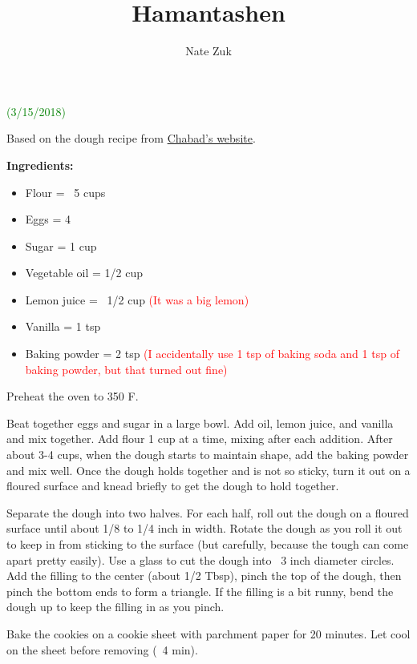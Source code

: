 \documentclass[11pt]{article}
\title{Hamantashen}
\author{Nate Zuk}
\begin{document}
\maketitle

\textcolor{green}{(3/15/2018)}

Based on the dough recipe from \href{https://www.chabad.org/library/article_cdo/aid/1366/jewish/Traditional-Hamantaschen.htm}{Chabad's website}.

\textbf{Ingredients:}

\begin{itemize}
\item Flour = ~5 cups
\item Eggs = 4
\item Sugar = 1 cup
\item Vegetable oil = 1/2 cup
\item Lemon juice = ~1/2 cup \textcolor{red}{(It was a big lemon)}
\item Vanilla = 1 tsp
\item Baking powder = 2 tsp \textcolor{red}{(I accidentally use 1 tsp of baking soda and 1 tsp of baking powder, but that turned out fine)}
\end{itemize}

Preheat the oven to 350 F.

Beat together eggs and sugar in a large bowl.  Add oil, lemon juice, and vanilla and mix together.  Add flour 1 cup at a time, mixing after each addition.  After about 3-4 cups, when the dough starts to maintain shape, add the baking powder and mix well.  Once the dough holds together and is not so sticky, turn it out on a floured surface and knead briefly to get the dough to hold together.

Separate the dough into two halves.  For each half, roll out the dough on a floured surface until about 1/8 to 1/4 inch in width.  Rotate the dough as you roll it out to keep in from sticking to the surface (but carefully, because the tough can come apart pretty easily).  Use a glass to cut the dough into ~3 inch diameter circles.  Add the filling to the center (about 1/2 Tbsp), pinch the top of the dough, then pinch the bottom ends to form a triangle.  If the filling is a bit runny, bend the dough up to keep the filling in as you pinch.

Bake the cookies on a cookie sheet with parchment paper for 20 minutes.  Let cool on the sheet before removing (~4 min).
\end{document}
